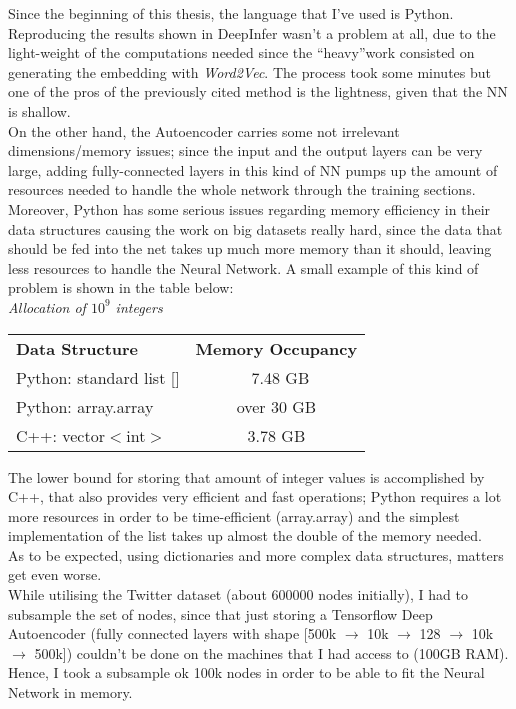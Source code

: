 \documentclass{article}
\begin{document}
			Since the beginning of this thesis, the language that I've used is Python. Reproducing the results shown in DeepInfer wasn't a problem at all, due to the light-weight of the computations needed since the \textquotedblleft heavy\textquotedblright work consisted on generating the embedding with \textit{Word2Vec}. The process took some minutes but one of the pros of the previously cited method is the lightness, given that the NN is shallow.\\
			On the other hand, the Autoencoder carries some not irrelevant dimensions/memory issues; since the input and the output layers can be very large, adding fully-connected layers in this kind of NN pumps up the amount of resources needed to handle the whole network through the training sections.\\
			Moreover, Python has some serious issues regarding memory efficiency in their data structures causing the work on big datasets really hard, since the data that should be fed into the net takes up much more memory than it should, leaving less resources to handle the Neural Network. A small example of this kind of problem is shown in the table below:\bigskip \\
			\textit{Allocation of $10^{9}$ integers}\\
			\vspace{0.8cm}
			\begin{centering}
				\begin{tabular}{l | c}
					\textbf{Data Structure} & \textbf{Memory Occupancy}\\
					Python: standard list [] & ~7.48 GB \\
					Python: array.array & over 30 GB\\
					C++: vector$<$int$>$ & 3.78 GB
				\end{tabular}
			\end{centering}
			\newline
			The lower bound for storing that amount of integer values is accomplished by C++, that also provides very efficient and fast operations; Python requires a lot more resources in order to be time-efficient (array.array) and the simplest implementation of the list takes up almost the double of the memory needed.\\
			As to be expected, using dictionaries and more complex data structures, matters get even worse.\smallskip\\
			While utilising the Twitter dataset (about 600000 nodes initially), I had to subsample the set of nodes, since that just storing a Tensorflow Deep Autoencoder (fully connected layers with shape [500k $\rightarrow$ 10k $\rightarrow$ 128 $\rightarrow$ 10k $\rightarrow$ 500k]) couldn't be done on the machines that I had access to (100GB RAM). Hence, I took a subsample ok 100k nodes in order to be able to fit the Neural Network in memory.\\
\end{document}
